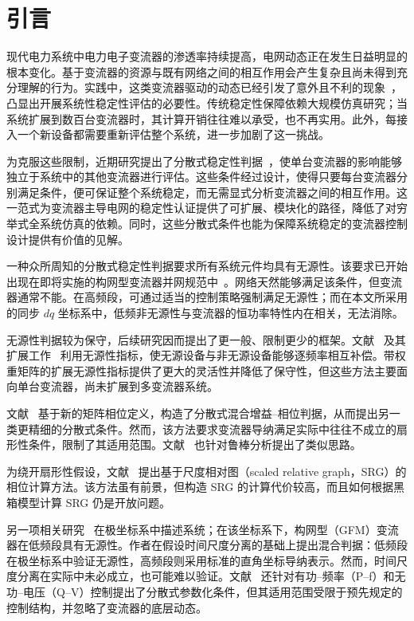 \section{引言}
现代电力系统中电力电子变流器的渗透率持续提高，电网动态正在发生日益明显的根本变化。基于变流器的资源与既有网络之间的相互作用会产生复杂且尚未得到充分理解的行为。实践中，这类变流器驱动的动态已经引发了意外且不利的现象~\cite{Cigre2024}，凸显出开展系统性稳定性评估的必要性。传统稳定性保障依赖大规模仿真研究；当系统扩展到数百台变流器时，其计算开销往往难以承受，也不再实用。此外，每接入一个新设备都需要重新评估整个系统，进一步加剧了这一挑战。

为克服这些限制，近期研究提出了分散式稳定性判据~\cite{chenExtendedFrequencyDomainPassivity2025a,huangGainPhaseDecentralized2024,häberle2025decentralizedparametricstabilitycertificates}，使单台变流器的影响能够独立于系统中的其他变流器进行评估。这些条件经过设计，使得只要每台变流器分别满足条件，便可保证整个系统稳定，而无需显式分析变流器之间的相互作用。这一范式为变流器主导电网的稳定性认证提供了可扩展、模块化的路径，降低了对穷举式全系统仿真的依赖。同时，这些分散式条件也能为保障系统稳定的变流器控制设计提供有价值的见解。

一种众所周知的分散式稳定性判据要求所有系统元件均具有无源性。该要求已开始出现在即将实施的构网型变流器并网规范中~\cite{fingridGridCode}。网络天然能够满足该条件，但变流器通常不能。在高频段，可通过适当的控制策略强制满足无源性；而在本文所采用的同步 $dq$ 坐标系中，低频非无源性与变流器的恒功率特性内在相关，无法消除。

无源性判据较为保守，后续研究因而提出了更一般、限制更少的框架。文献~\cite{chenExtendedFrequencyDomainPassivity2025a} 及其扩展工作~\cite{chenUnifiedFlexibleFrequencyDomain2025a} 利用无源性指标，使无源设备与非无源设备能够逐频率相互补偿。带权重矩阵的扩展无源性指标提供了更大的灵活性并降低了保守性，但这些方法主要面向单台变流器，尚未扩展到多变流器系统。

文献~\cite{huangGainPhaseDecentralized2024} 基于新的矩阵相位定义，构造了分散式混合增益--相位判据，从而提出另一类更精细的分散式条件。然而，该方法要求变流器导纳满足实际中往往不成立的扇形性条件，限制了其适用范围。文献~\cite{woolcockMixedGainPhase2023} 也针对鲁棒分析提出了类似思路。

为绕开扇形性假设，文献~\cite{baron2025decentralized} 提出基于尺度相对图（scaled relative graph，SRG）的相位计算方法。该方法虽有前景，但构造 SRG 的计算代价较高，而且如何根据黑箱模型计算 SRG 仍是开放问题。

另一项相关研究~\cite{deyPassivityBasedDecentralizedCriteria2023} 在极坐标系中描述系统；在该坐标系下，构网型（GFM）变流器在低频段具有无源性。作者在假设时间尺度分离的基础上提出混合判据：低频段在极坐标系中验证无源性，高频段则采用标准的直角坐标导纳表示。然而，时间尺度分离在实际中未必成立，也可能难以验证。文献~\cite{häberle2025decentralizedparametricstabilitycertificates} 还针对有功--频率（P--f）和无功--电压（Q--V）控制提出了分散式参数化条件，但其适用范围受限于预先规定的控制结构，并忽略了变流器的底层动态。

